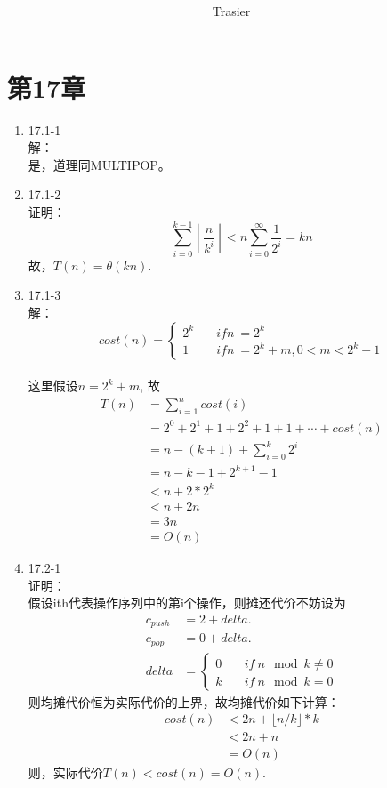 \documentclass[UTF8]{ctexart}
\begin{document}
\title{\\}
\vspace{2cm}
\author{\Large Trasier}
\date{}
\maketitle

\section*{第17章}
\begin{enumerate}
    \item 17.1-1 \\
    解：\\
    是，道理同MULTIPOP。
	
	\item 17.1-2 \\
	证明：\\
	\[
		\sum_{i=0}^{k-1}\left \lfloor \frac{n}{k^i} \right \rfloor <
		n\sum_{i=0}^{\infty} \frac{1}{2^i} = kn
	\]
	故，$T(n) = \theta{(kn)}$.
	
	\item 17.1-3 \\
	解：
	\[
		cost(n) = \left\{
		\begin{aligned}
		2^k	&\quad if n\ = 2^k \\
		1	&\quad if n\ = 2^k+m, 0<m<2^k-1
		\end{aligned}
        \right.
	\]	\\
	这里假设$n = 2^k + m$, 故
	\begin{align*}
		T(n)&= \sum_{i=1}^{n} cost(i)	\\
			&= 2^0 + 2^1 + 1 + 2^2 + 1 + 1 + \cdots + cost(n)	\\
			&= n - (k+1) + \sum_{i=0}^{k} 2^i	\\
			&= n - k - 1 + 2^{k+1} -1	\\
			&< n + 2*2^k	\\
			&< n + 2n	\\
			&= 3n	\\
			&= O(n)
	\end{align*}
	
	\item 17.2-1 \\
	证明：\\
	假设ith代表操作序列中的第i个操作，则摊还代价不妨设为
	\[
		\begin{aligned}
		c_{push} &= 2 + delta.	\\
		c_{pop} &= 0 + delta.	\\
		delta &= \left\{
		\begin{aligned}
			0 &\quad if\ n\mod k\neq0	\\
			k &\quad if\ n\mod k=0
		\end{aligned}
		\right.
		\end{aligned}
	\]
	则均摊代价恒为实际代价的上界，故均摊代价如下计算：
	\begin{align*}
		cost(n) &< 2n + \lfloor n/k \rfloor *k	\\
			&< 2n + n	\\
			&= O(n)
	\end{align*}
	则，实际代价$T(n) < cost(n) = O(n)$.
	

\end{enumerate}
\end{document}
